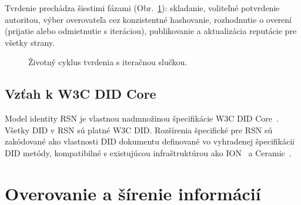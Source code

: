 \documentclass[11pt,a4paper,twocolumn]{article}
\begin{document}
Tvrdenie prechádza šiestimi fázami (Obr.~\ref{fig:lifecycle}): skladanie, voliteľné potvrdenie autoritou, výber overovateľa cez konzistentné hashovanie, rozhodnutie o overení (prijatie alebo odmietnutie s iteráciou), publikovanie a aktualizácia reputácie pre všetky strany.

\begin{figure}[ht]
\centering
{}
\caption{Životný cyklus tvrdenia s iteračnou slučkou.}
\label{fig:lifecycle}
\end{figure}

\subsection{Vzťah k W3C DID Core}

Model identity RSN je vlastnou nadmnožinou špecifikácie W3C DID Core~\cite{did2022}. Všetky DID v RSN sú platné W3C DID. Rozšírenia špecifické pre RSN sú zakódované ako vlastnosti DID dokumentu definované vo vyhradenej špecifikácii DID metódy, kompatibilné s existujúcou infraštruktúrou ako ION~\cite{buchner2021} a Ceramic~\cite{ceramic2023}.

\section{Overovanie a šírenie informácií}
\end{document}
